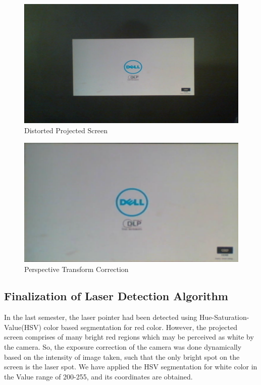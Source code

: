 \documentclass[12pt, a4paper]{article}
\begin{document}
\begin{figure}[htp]
	\centering
	\includegraphics[scale=0.20]{looma1.png}
	\caption{Distorted Projected Screen}
	\label{}
\end{figure}

\begin{figure}[htp]
	\centering
	\includegraphics[scale=0.20]{result.png}
	\caption{Perspective Transform Correction}
	\label{}
\end{figure}

	
\subsection{Finalization of Laser Detection Algorithm}
	In the last semester, the laser pointer had been detected using Hue-Saturation-Value(HSV) color based segmentation for red color. However, the projected screen comprises of many bright red regions which may be perceived  as white by the camera. So, the exposure correction of the camera was done dynamically based on the intensity of image taken, such that the only bright spot on the screen is the laser spot. We have applied the HSV segmentation for white color in the Value range of 200-255, and its coordinates are obtained. 
	
\end{document}
